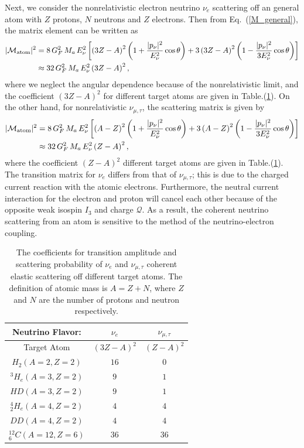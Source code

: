 Next, we consider the nonrelativistic electron neutrino $\nu_e$ scattering off an general atom with $Z$ protons, $N$ neutrons and $Z$ electrons. Then from Eq.~(\ref{M_general}), the matrix element can be written as
\begin{align}
\label{Probability_e}
|\mathcal{M}_{\mathrm{atom}}|^2&=8\,G^2_F\,M_a\,E_\nu^2\left[\left(3Z-A\right)^2\left(1+\frac{|p_\nu|^2}{E^2_\nu}\cos\theta\right)+3\left(3Z-A\right)^2\left(1-\frac{|p_\nu|^2}{3E_\nu^2}\cos\theta\right)\right]\notag\\
&\approx32\,G^2_F\,M_a\,E_\nu^2\left(3Z-A\right)^2,
\end{align}
where we neglect the angular dependence because of the nonrelativistic limit, and the coefficient $\left(3Z-A\right)^2$ for different target atoms are given in Table.(\ref{Table001}). On the other hand, for nonrelativistic $\nu_{\mu,\tau}$, the scattering matrix is given by
\begin{align}
\label{Probability_mt}
|\mathcal{M}_{\mathrm{atom}}|^2&=8\,G^2_F\,M_a\,E_\nu^2\left[\left(A-Z\right)^2\left(1+\frac{|p_\nu|^2}{E^2_\nu}\cos\theta\right)+3\left(A-Z\right)^2\left(1-\frac{|p_\nu|^2}{3E_\nu^2}\cos\theta\right)\right]\notag\\
&\approx32\,G^2_F\,M_a\,E_\nu^2\left(Z-A\right)^2,
\end{align}
where the coefficient $\left(Z-A\right)^2$ different target atoms are given in Table.(\ref{Table001}). The transition matrix for $\nu_e$ differs from that of $\nu_{\mu,\tau}$; this is due to the charged current reaction with the atomic electrons. Furthermore, the neutral current interaction for the electron and proton will cancel each other because of the opposite weak isospin $I_3$ and charge $\mathcal{Q}$. As a result, the coherent neutrino scattering from an atom is sensitive to the method of the neutrino-electron coupling.
\begin{table}[h]
\centering
\begin{tabular}{c|c|c}
\hline\hline
 Neutrino Flavor:&$\nu_e$ &$\nu_{\mu,\tau}$\\
\hline\hline
Target Atom & $(3Z-A)^2$  & $(Z-A)^2$\\
\hline
$H_2(A=2, Z=2)$ & $16$ & $0$\\
\hline
${}^{3}H_e(A=3, Z=2)$  & $9$ & $1$\\
\hline
$HD(A=3, Z=2)$ & $9$   & $1$\\
\hline
${}^{4}_2H_e(A=4, Z=2)$  &$4$ & $4$\\
\hline
$DD(A=4, Z=2)$  & $4$ & $4$\\
\hline
${}^{12}_{{}6}C(A=12, Z=6)$  & $36$& $36$\\
\hline\hline
\end{tabular}
\caption{The coefficients for transition amplitude and scattering probability of $\nu_e$ and $\nu_{\mu,\tau}$  coherent elastic scattering off different target atoms. The definition of atomic mass is $A=Z+N$, where $Z$ and $N$ are the number of protons and neutron respectively.}
\label{Table001}  
\end{table}%

